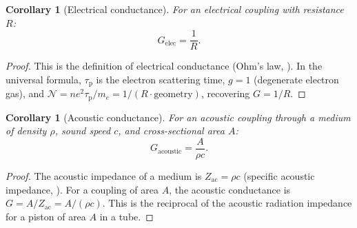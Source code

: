 \documentclass[twocolumn,10pt,a4paper]{article}
\newtheorem{corollary}[theorem]{Corollary}
\theoremstyle{definition}
\theoremstyle{remark}
\newcommand{\tauP}{\tau_{\mathrm{p}}}
\begin{document}
\begin{corollary}[Electrical conductance]\label{cor:elec_cond}
For an electrical coupling with resistance $R$:
\begin{equation}\label{eq:elec_conductance}
G_{\mathrm{elec}} = \frac{1}{R}.
\end{equation}
\end{corollary}

\begin{proof}
This is the definition of electrical conductance (Ohm's law, \citealt{Ohm1827}). In the universal formula, $\tauP$ is the electron scattering time, $g = 1$ (degenerate electron gas), and $\mathcal{N} = ne^2\tauP/m_e = 1/(R \cdot \text{geometry})$, recovering $G = 1/R$.
\end{proof}

\begin{corollary}[Acoustic conductance]\label{cor:acoustic_cond}
For an acoustic coupling through a medium of density $\rho$, sound speed $c$, and cross-sectional area $A$:
\begin{equation}\label{eq:acoustic_conductance}
G_{\mathrm{acoustic}} = \frac{A}{\rho c}.
\end{equation}
\end{corollary}

\begin{proof}
The acoustic impedance of a medium is $Z_{\mathrm{ac}} = \rho c$ (specific acoustic impedance, \citealt{Kinsler2000}). For a coupling of area $A$, the acoustic conductance is $G = A / Z_{\mathrm{ac}} = A / (\rho c)$. This is the reciprocal of the acoustic radiation impedance for a piston of area $A$ in a tube.
\end{proof}
\end{document}
